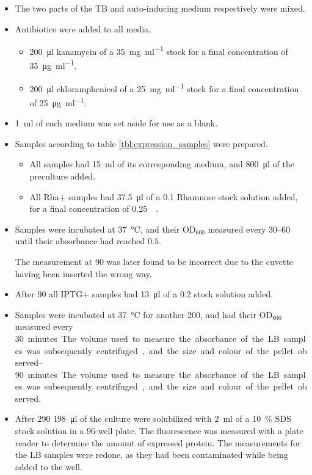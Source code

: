 \documentclass[a4paper]{scrreprt}
\begin{document}
\begin{itemize}
	\item The two parts of the TB and auto-inducing medium respectively
		were mixed.
	\item Antibiotics were added to all media.
		\begin{itemize}
			\item \SI{200}{\ul} kanamycin of a \SI{35}{\mg\per\ml}
				stock for a final concentration of
				\SI{35}{\ug\per\ml}.
			\item \SI{200}{\ul} chloramphenicol of a
				\SI{25}{\mg\per\ml} stock for a final
				concentration of \SI{25}{\ug\per\ml}.
		\end{itemize}
	\item \SI{1}{\ml} of each medium was set aside for use as a blank.
	\item Samples according to table \ref{tbl:expression_samples} were
		prepared.
		\begin{itemize}
			\item All samples had \SI{15}{\ml} of its corresponding
				medium, and \SI{800}{\ul} of the preculture
				added.
			\item All Rha+ samples had \SI{37.5}{\ul} of a
				\SI{0.1}{\Molar} Rhamnose stock solution added,
				for a final concentration of
				\SI{0.25}{\milli\Molar}.
		\end{itemize}
	\item Samples were incubated at \SI{37}{\celsius}, and their OD$_{600}$
		measured every \SIrange{30}{60}{\min} until their absorbance had
		reached $0.5$.

		The measurement at \SI{90}{\min} was later found to be
		incorrect due to the cuvette having been inserted the wrong
		way.

	\item After \SI{90}{\min} all IPTG+ samples had \SI{13}{\ul} of a
		\SI{0.2}{\Molar} stock solution added.
	\item Samples were incubated at \SI{37}{\celsius} for another
		\SI{200}{\min}, and had their OD$_{600}$ measured every
		\SIrange{30}{90} minutes. The volume used to measure the
		absorbance of the LB samples was subsequently centrifuged, and
		the size and colour of the pellet observed.
	\item After \SI{290}{\min} \SI{198}{\ul} of the culture were
		solubilized with \SI{2}{\ml} of a \SI{10}{\percent} SDS stock
		solution in a 96-well plate. The fluorescence was measured with
		a plate reader to determine the amount of expressed protein. The
		measurements for the LB samples were redone, as they had been
		contaminated while being added to the well.
\end{itemize}
\end{document}
